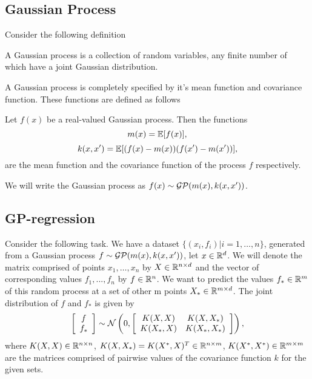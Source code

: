 \documentclass[12pt]{article}
\begin{document}
\subsection{Gaussian Process}

	\hspace{0.6cm}Consider the following definition
	\begin{definition}
		A Gaussian process is a collection of random variables, any finite number of which have a joint Gaussian distribution.
	\end{definition}
	A Gaussian process is completely specified by it's mean function and covariance function. These functions are defined as follows
	\begin{definition}
		Let $f(x)$ be a real-valued Gaussian process. Then the functions
		$$m(x) = \mathbb{E}[f(x)],$$
		$$k(x, x') = \mathbb{E}[(f(x) - m(x)) (f(x') - m(x'))],$$
		are the mean function and the covariance function of the process $f$ respectively. 
	\end{definition}
	
	We will write the Gaussian process as $f(x) \sim \mathcal{GP}(m(x), k(x, x'))$.
	
\subsection{GP-regression}
	\hspace{0.6cm}Consider the following task. We have a dataset $\{(x_i, f_i) | i = 1, \ldots, n\}$, generated from a Gaussian process $f \sim \mathcal{GP}(m(x), k(x, x'))$, let $x \in \mathbb{R}^d$.  We will denote the matrix comprised of points $x_1, \ldots, x_n$ by $X \in \mathbb{R}^{n \times d}$ and the vector of corresponding values $f_1, ..., f_n$ by $f \in \mathbb{R}^n$. We want to predict the values $f_* \in \mathbb{R}^m$ of this random process at a set of other m points $X_* \in \mathbb{R}^{m \times d}$. The joint distribution of $f$ and $f_*$ is given by
	$$
	\left [ \begin{array}{c} f\\ f_* \end{array} \right ]
	\sim
	\mathcal{N} \left ( 0, \left [\begin{array}{cc} K(X, X) & K(X, X_*)\\ K(X_*, X) & K(X_*, X_*) \end{array} \right] \right ),
	$$
	where $K(X, X) \in \mathbb{R}^{n \times n}$, $K(X, X_*) = K(X^*, X)^T \in \mathbb{R}^{n \times m}$, $K(X^*, X^*) \in \mathbb{R}^{m \times m}$ are the matrices comprised of pairwise values of the covariance function $k$ for the given sets.
	
\end{document}
